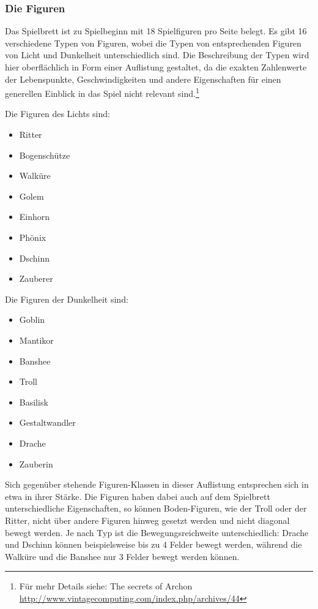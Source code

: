 \subsubsection{Die Figuren}
Das Spielbrett ist zu Spielbeginn mit 18 Spielfiguren pro Seite belegt. Es gibt 16 verschiedene Typen von Figuren, wobei die Typen von entsprechenden Figuren von Licht und Dunkelheit unterschiedlich sind. Die Beschreibung der Typen wird hier oberflächlich in Form einer Auflistung gestaltet, da die exakten Zahlenwerte der Lebenspunkte, Geschwindigkeiten und andere Eigenschaften für einen generellen Einblick in das Spiel nicht relevant sind.\footnote{Für mehr Details siehe: The secrets of Archon \url{http://www.vintagecomputing.com/index.php/archives/44}}
\begin{multicols}{2}
	Die Figuren des Lichts sind: 
	\begin{itemize}
		\item Ritter
		\item Bogenschütze
		\item Walküre
		\item Golem
		\item Einhorn
		\item Phönix
		\item Dschinn
		\item Zauberer
	\end{itemize}
\columnbreak
	Die Figuren der Dunkelheit sind:
	\begin{itemize}
		\item Goblin
		\item Mantikor
		\item Banshee
		\item Troll
		\item Basilisk
		\item Gestaltwandler
		\item Drache
		\item Zauberin
	\end{itemize}
\end{multicols}
\noindent Sich gegenüber stehende Figuren-Klassen in dieser Auflistung entsprechen sich in etwa in ihrer Stärke. Die Figuren haben dabei auch auf dem Spielbrett unterschiedliche Eigenschaften, so können Boden-Figuren, wie der Troll oder der Ritter, nicht über andere Figuren hinweg gesetzt werden und nicht diagonal bewegt werden. Je nach Typ ist die Bewegungsreichweite unterschiedlich: Drache und Dschinn können beispielsweise bis zu 4 Felder bewegt werden, während die Walküre und die Banshee nur 3 Felder bewegt werden können.\\
